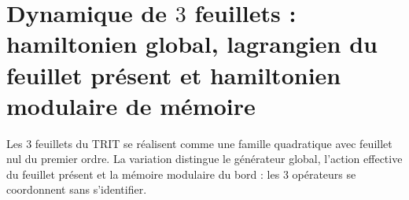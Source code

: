 \chapter{Dynamique de \texorpdfstring{\(3\)}{3} feuillets : hamiltonien global, lagrangien du feuillet présent et hamiltonien modulaire de mémoire}
\label{chap:md-dinamica-tres-hojas-definitiva}
Les \(3\) feuillets du TRIT se réalisent comme une famille quadratique avec feuillet
nul du premier ordre. La variation distingue le générateur global, l'action
effective du feuillet présent et la mémoire modulaire du bord : les \(3\)
opérateurs se coordonnent sans s'identifier.
\begin{HMTScientificOwnerSubordinated}

\end{HMTScientificOwnerSubordinated}
\begingroup
\let\HMTOwnerSection\section
\let\HMTOwnerSubsection\subsection
\let\HMTOwnerSubsubsection\subsubsection
\let\HMTOwnerParagraph\paragraph
\let\chapter\HMTOwnerSection
\let\section\HMTOwnerSubsection
\let\subsection\HMTOwnerSubsubsection
\let\subsubsection\HMTOwnerParagraph

\endgroup


